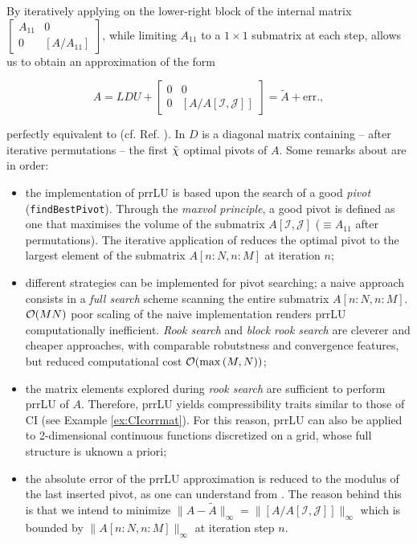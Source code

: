 By iteratively applying  on the lower-right block of the internal matrix \(\scriptstyle \begin{bmatrix} A_{11} & 0 \\
	0 & [A / A_{11}] \end{bmatrix}\), while limiting $A_{11}$ to a $1\times 1$ submatrix at each step,  allows us to obtain an approximation of the form 

\begin{equation}
	A = LDU + \begin{bmatrix}
		0 & 0\\
		0 & [A/A[\mathcal{I}, \mathcal{J}]]
	\end{bmatrix} = \tilde{A} + \textrm{err.},
	\label{eq:prrLUCI}
\end{equation}

perfectly equivalent to  (cf. Ref. \cite{Fernandez2024}). In   $D$ is a diagonal matrix containing -- after iterative permutations -- the first ${\tilde \chi}$ optimal pivots of $A$.
Some remarks about  are in order: 
\begin{itemize}
	\item the implementation of prrLU is based upon the search of a good \textit{pivot} (\texttt{findBestPivot}). Through the \textit{maxvol principle}, a good pivot is defined as one that maximises the volume of the submatrix $A[\mathcal{I}, \mathcal{J}]$ ($\equiv A_{11}$ after permutations). The iterative application of  reduces the optimal pivot to the largest element of the submatrix $A[n\!:\!N,n\!:\!M]$ at iteration $n$;
	\item different strategies can be implemented for pivot searching; a naive approach consists in a \textit{full search} scheme scanning the entire submatrix $A[n\!:\!N,n\!:\!M]$. $\mathcal{O}(MN)$ poor scaling of the naive implementation renders prrLU computationally inefficient. \textit{Rook search} \cite{Poole2000} and \textit{block rook search} \cite{Fernandez2024} are cleverer and cheaper approaches, with comparable robutstness and convergence features, but reduced computational cost $\mathcal{O}(\max\left(M,N\right))$;  
	\item the matrix elements explored during \textit{rook search} are sufficient to perform prrLU of $A$. Therefore, prrLU yields compressibility traits similar to those of CI (see Example \ref{ex:CIcorrmat}). For this reason, prrLU can also be applied to 2-dimensional continuous functions discretized on a grid, whose full structure is uknown a priori; 	
	\item the absolute error of the prrLU approximation is reduced to the modulus of the last inserted pivot, as one can understand from . The reason behind this is that we intend to minimize $\parallel\! A - \tilde{A}\!\parallel_{\infty} = \parallel\![A/A[\mathcal{I}, \mathcal{J}]] \!\parallel_{\infty}$ which is bounded by $\parallel\! A[n\!:\!N, n\!:\!M]\!\parallel_{\infty}$ at iteration step $n$.  
\end{itemize}


